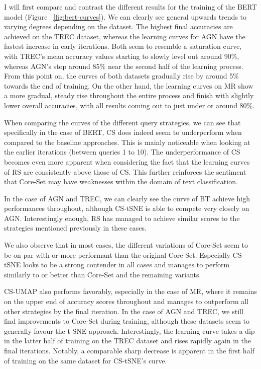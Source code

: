 \documentclass[english,bachelor,ul]{webisthesis} %
\begin{document}
I will first compare and contrast the different results for the training of the BERT model (Figure ~\ref{fig:bert-curves}). We can clearly see general upwards trends to varying degrees depending on the dataset. The highest final accuracies are achieved on the TREC dataset, whereas the learning curves for AGN have the fastest increase in early iterations. Both seem to resemble a saturation curve, with TREC's mean accuracy values starting to slowly level out around 90\%, whereas AGN's stop around 85\% near the second half of the learning process. From this point on, the curves of both datasets gradually rise by around 5\% towards the end of training. On the other hand, the learning curves on MR show a more gradual, steady rise throughout the entire process and finish with slightly lower overall accuracies, with all results coming out to just under or around 80\%. 

When comparing the curves of the different query strategies, we can see that specifically in the case of BERT, CS does indeed seem to underperform when compared to the baseline approaches. This is mainly noticeable when looking at the earlier iterations (between queries 1 to 10). The underperformance of CS becomes even more apparent when considering the fact that the learning curves of RS are consistently above those of CS. This further reinforces the sentiment that Core-Set may have weaknesses within the domain of text classification. 

In the case of AGN and TREC, we can clearly see the curve of BT achieve high performances throughout, although CS-tSNE is able to compete very closely on AGN. Interestingly enough, RS has managed to achieve similar scores to the strategies mentioned previously in these cases.

We also observe that in most cases, the different variations of Core-Set seem to be on par with or more performant than the original Core-Set. Especially CS-tSNE looks to be a strong contender in all cases and manages to perform similarly to or better than Core-Set and the remaining variants. 

CS-UMAP also performs favorably, especially in the case of MR, where it remains on the upper end of accuracy scores throughout and manages to outperform all other strategies by the final iteration. In the case of AGN and TREC, we still find improvements to Core-Set during training, although these datasets seem to generally favour the t-SNE approach. Interestingly, the learning curve takes a dip in the latter half of training on the TREC dataset and rises rapidly again in the final iterations. Notably, a comparable sharp decrease is apparent in the first half of training on the same dataset for CS-tSNE's curve.
\end{document}
